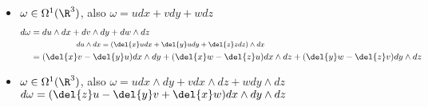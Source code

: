 \begin{exmp}
	\begin{itemize}
		\item $ \omega \in \Omega^1(\R^3) $, also $ \omega = udx + vdy + wdz $
			\begin{align*}
				d\omega &= du \wedge dx + dv \wedge dy + dw \wedge dz\\
				\noalign{\centering\footnotesize $du \wedge dx = (\del{x}u dx + \del{y}u dy + \del{z}z dz) \wedge dx$}
				&= (\del{x}v - \del{y}u) dx \wedge dy + (\del{x}w - \del{z}u) dx \wedge dz + (\del{y}w - \del{z}v) dy \wedge dz
			\end{align*}
		\item $ \omega \in \Omega^1(\R^3) $, also $ \omega = u dx \wedge dy + v dx \wedge dz + w dy \wedge dz $\\
			$ d\omega = (\del{z}u - \del{y}v + \del{x}w) dx \wedge dy \wedge dz $
	\end{itemize}
\end{exmp}

